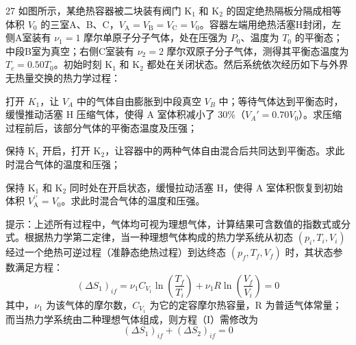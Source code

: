 \begin{problem}[理论考试][绝热容器与热力学过程]{27}
  如图所示，某绝热容器被二块装有阀门 $\mathrm{K}_{1}$ 和 $\mathrm{K}_{2}$ 的固定绝热隔板分隔成相等体积 $V_{0}$ 的三室A、B、C，$V_{\mathrm{A}} = V_{\mathrm{B}} = V_{\mathrm{C}} = V_{0}$。容器左端用绝热活塞H封闭，左侧A室装有 $\nu_{1} = 1$ 摩尔单原子分子气体，处在压强为 $P_{0}$、温度为 $T_{0}$ 的平衡态；中段B室为真空；右侧C室装有 $\nu_{2} = 2$ 摩尔双原子分子气体，测得其平衡态温度为 $T_{c} = 0.50T_{0}$。初始时刻 $\mathrm{K}_{1}$ 和 $\mathrm{K}_{2}$ 都处在关闭状态。然后系统依次经历如下与外界无热量交换的热力学过程：
  \begin{subproblem}
    打开 $K_{1}$，让 $V_{A}$ 中的气体自由膨胀到中段真空 $V_{B}$ 中；等待气体达到平衡态时，缓慢推动活塞 H 压缩气体，使得 A 室体积减小了 30\%（$V_{A}' = 0.70V_{0}$）。求压缩过程前后，该部分气体的平衡态温度及压强；
  \end{subproblem}
  \begin{subproblem}
    保持 $\mathrm{K}_{1}$ 开启，打开 $\mathrm{K}_{2}$，让容器中的两种气体自由混合后共同达到平衡态。求此时混合气体的温度和压强；
  \end{subproblem}
  \begin{subproblem}
    保持 $\mathrm{K}_{1}$ 和 $\mathrm{K}_{2}$ 同时处在开启状态，缓慢拉动活塞 $\mathrm{H}$，使得 $\mathrm{A}$ 室体积恢复到初始体积 $V_{\mathrm{A}}^{\prime \prime} = V_{0}$。求此时混合气体的温度和压强。
  \end{subproblem}
  提示：上述所有过程中，气体均可视为理想气体，计算结果可含数值的指数式或分式。根据热力学第二定律，当一种理想气体构成的热力学系统从初态 $(p_i, T_i, V_i)$ 经过一个绝热可逆过程（准静态绝热过程）到达终态 $(p_f, T_f, V_f)$ 时，其状态参数满足方程：
  \begin{equation}
    \left(\Delta S_{1}\right)_{i f} = \nu_{1} C_{V_{1}} \ln (\frac{T_{f}}{T_{i}}) + \nu_{1} R \ln (\frac{V_{f}}{V_{i}}) = 0
    \label{eq:I}
  \end{equation}
  其中，$\nu_{1}$ 为该气体的摩尔数，$C_{V_{1}}$ 为它的定容摩尔热容量，R 为普适气体常量；而当热力学系统由二种理想气体组成，则方程（I）需修改为
  \begin{equation}
    \left(\Delta S_{1}\right)_{i f} + \left(\Delta S_{2}\right)_{i f} = 0
    \label{eq:II}
  \end{equation}
\end{problem}